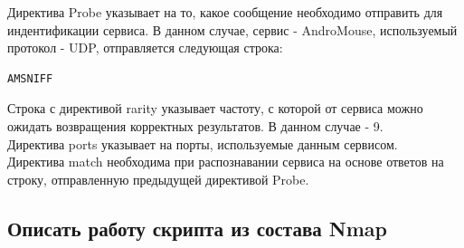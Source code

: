 \documentclass[10pt,a4paper]{report}
\begin{document}
Директива Probe указывает на то, какое сообщение необходимо отправить для индентификации сервиса. В данном случае, сервис - AndroMouse, используемый протокол - UDP, отправляется следующая строка:

\begin{verbatim}
AMSNIFF
\end{verbatim}

Строка с директивой rarity указывает частоту, с которой от сервиса можно ожидать возвращения корректных результатов. В данном случае - 9. \\
Директива ports указывает на порты, используемые данным сервисом. \\
Директива match необходима при распознавании сервиса на основе ответов на строку, отправленную предыдущей директивой Probe.

	\subsection{Описать работу скрипта из состава Nmap}
\end{document}
